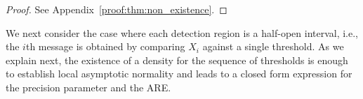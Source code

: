 \begin{proof}
See Appendix~\ref{proof:thm:non_existence}.
\end{proof}


We next consider the case where each detection region is a half-open interval, i.e., the $i$th message is obtained by comparing $X_i$ against a single threshold. As we explain next, the existence of a density for the sequence of thresholds is enough to establish local asymptotic normality and leads to a closed form expression for the precision parameter and the ARE.  


